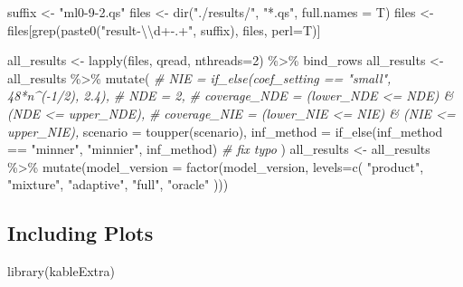 \documentclass[
]{article}
\newenvironment{Shaded}{\begin{snugshade}}{\end{snugshade}}
\newcommand{\AttributeTok}[1]{\textcolor[rgb]{0.77,0.63,0.00}{#1}}
\newcommand{\CommentTok}[1]{\textcolor[rgb]{0.56,0.35,0.01}{\textit{#1}}}
\newcommand{\DecValTok}[1]{\textcolor[rgb]{0.00,0.00,0.81}{#1}}
\newcommand{\FunctionTok}[1]{\textcolor[rgb]{0.00,0.00,0.00}{#1}}
\newcommand{\NormalTok}[1]{#1}
\newcommand{\OtherTok}[1]{\textcolor[rgb]{0.56,0.35,0.01}{#1}}
\newcommand{\SpecialCharTok}[1]{\textcolor[rgb]{0.00,0.00,0.00}{#1}}
\newcommand{\StringTok}[1]{\textcolor[rgb]{0.31,0.60,0.02}{#1}}
\begin{document}
\begin{Shaded}
\begin{Highlighting}[]
\NormalTok{suffix }\OtherTok{\textless{}{-}} \StringTok{"ml0{-}9{-}2.qs"}
\NormalTok{files }\OtherTok{\textless{}{-}} \FunctionTok{dir}\NormalTok{(}\StringTok{"./results/"}\NormalTok{, }\StringTok{"*.qs"}\NormalTok{, }\AttributeTok{full.names =}\NormalTok{ T)}
\NormalTok{files }\OtherTok{\textless{}{-}}\NormalTok{ files[}\FunctionTok{grep}\NormalTok{(}\FunctionTok{paste0}\NormalTok{(}\StringTok{"result{-}}\SpecialCharTok{\textbackslash{}\textbackslash{}}\StringTok{d+{-}.+"}\NormalTok{, suffix), files, }\AttributeTok{perl=}\NormalTok{T)]}

\NormalTok{all\_results }\OtherTok{\textless{}{-}} \FunctionTok{lapply}\NormalTok{(files, qread, }\AttributeTok{nthreads=}\DecValTok{2}\NormalTok{) }\SpecialCharTok{\%\textgreater{}\%}\NormalTok{ bind\_rows}
\NormalTok{all\_results }\OtherTok{\textless{}{-}}\NormalTok{ all\_results }\SpecialCharTok{\%\textgreater{}\%} \FunctionTok{mutate}\NormalTok{(}
  \CommentTok{\# NIE = if\_else(coef\_setting == "small", 48*n\^{}({-}1/2), 2.4),}
  \CommentTok{\# NDE = 2,}
  \CommentTok{\# coverage\_NDE = (lower\_NDE \textless{}= NDE) \& (NDE \textless{}= upper\_NDE),}
  \CommentTok{\# coverage\_NIE = (lower\_NIE \textless{}= NIE) \& (NIE \textless{}= upper\_NIE),}
  \AttributeTok{scenario =} \FunctionTok{toupper}\NormalTok{(scenario),}
  \AttributeTok{inf\_method =} \FunctionTok{if\_else}\NormalTok{(inf\_method }\SpecialCharTok{==} \StringTok{"minner"}\NormalTok{, }\StringTok{"minnier"}\NormalTok{, inf\_method) }\CommentTok{\# fix typo}
\NormalTok{)}
\NormalTok{all\_results }\OtherTok{\textless{}{-}}\NormalTok{ all\_results }\SpecialCharTok{\%\textgreater{}\%} 
  \FunctionTok{mutate}\NormalTok{(}\AttributeTok{model\_version =} \FunctionTok{factor}\NormalTok{(model\_version, }\AttributeTok{levels=}\FunctionTok{c}\NormalTok{(}
    \StringTok{"product"}\NormalTok{, }\StringTok{"mixture"}\NormalTok{, }\StringTok{"adaptive"}\NormalTok{, }\StringTok{"full"}\NormalTok{, }\StringTok{"oracle"}
\NormalTok{  )))}
\end{Highlighting}
\end{Shaded}

\hypertarget{including-plots}{%
\subsection{Including Plots}\label{including-plots}}

\begin{Shaded}
\begin{Highlighting}[]
\FunctionTok{library}\NormalTok{(kableExtra)}
\end{Highlighting}
\end{Shaded}
\end{document}
